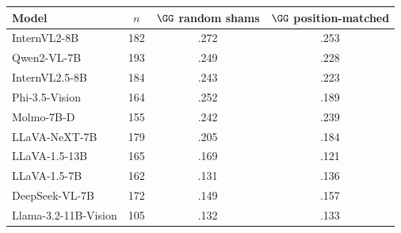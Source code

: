 \begin{tabular}{@{}lccc@{}}
\toprule
Model & $n$ & $\GG$ random shams & $\GG$ position-matched \\
\midrule
InternVL2-8B & 182 & .272 & .253 \\
Qwen2-VL-7B & 193 & .249 & .228 \\
InternVL2.5-8B & 184 & .243 & .223 \\
Phi-3.5-Vision & 164 & .252 & .189 \\
Molmo-7B-D & 155 & .242 & .239 \\
LLaVA-NeXT-7B & 179 & .205 & .184 \\
LLaVA-1.5-13B & 165 & .169 & .121 \\
LLaVA-1.5-7B & 162 & .131 & .136 \\
DeepSeek-VL-7B & 172 & .149 & .157 \\
Llama-3.2-11B-Vision & 105 & .132 & .133 \\
\bottomrule
\end{tabular}
